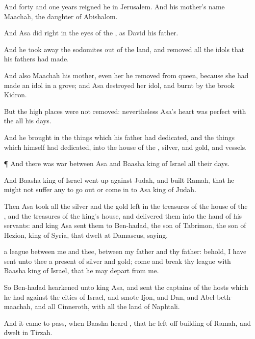{And
forty and
one
years
reigned he in
Jerusalem. And his
mother’s
name
{}
Maachah, the
daughter of
Abishalom.

And
Asa
did
{}
right in the
eyes of the
{}, as
{}
David his
father.

And he took
away the
sodomites out of the
land, and
removed all the
idols that his
fathers had
made.

And also
Maachah his
mother, even her he
removed from
{}
queen, because she had
made an
idol in a
grove; and
Asa
destroyed her
idol, and
burnt
{} by the
brook
Kidron.

But the high
places were not
removed: nevertheless
Asa’s
heart was
perfect with the
{} all his
days.

And he
brought in the
things which his
father had
dedicated, and the things which himself had
dedicated, into the
house of the
{},
silver, and
gold, and
vessels.


\par }{\PP {}¶ And there was
war between
Asa and
Baasha
king of
Israel all their
days.

And
Baasha
king of
Israel went
up against
Judah, and
built
Ramah, that he might not
suffer any to go
out or come
in to
Asa
king of
Judah.

Then
Asa
took all the
silver and the
gold
{}
left in the
treasures of the
house of the
{}, and the
treasures of the
king’s
house, and
delivered them into the
hand of his
servants: and
king
Asa
sent them to
Ben-hadad, the
son of
Tabrimon, the
son of
Hezion,
king of
Syria, that
dwelt at
Damascus,
saying,

 a
league between me and thee,
{} between my
father and thy
father: behold, I have
sent unto thee a
present of
silver and
gold;
come and
break thy
league with
Baasha
king of
Israel, that he may
depart from me.

So
Ben-hadad
hearkened unto
king
Asa, and
sent the
captains of the
hosts which he had against the
cities of
Israel, and
smote
Ijon, and
Dan, and
Abel-beth-maachah, and all
Cinneroth, with all the
land of
Naphtali.

And it came to pass, when
Baasha
heard
{}, that he left
off
building of
Ramah, and
dwelt in
Tirzah.

}
